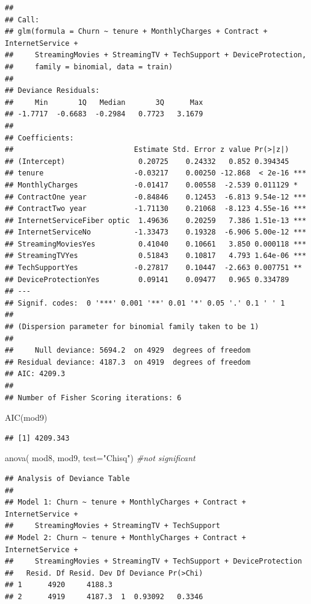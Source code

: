 \documentclass[
  twoside]{article}
\newenvironment{Shaded}{\begin{snugshade}}{\end{snugshade}}
\newcommand{\AttributeTok}[1]{\textcolor[rgb]{0.77,0.63,0.00}{#1}}
\newcommand{\CommentTok}[1]{\textcolor[rgb]{0.56,0.35,0.01}{\textit{#1}}}
\newcommand{\FunctionTok}[1]{\textcolor[rgb]{0.00,0.00,0.00}{#1}}
\newcommand{\NormalTok}[1]{#1}
\newcommand{\StringTok}[1]{\textcolor[rgb]{0.31,0.60,0.02}{#1}}
\begin{document}
\begin{verbatim}
## 
## Call:
## glm(formula = Churn ~ tenure + MonthlyCharges + Contract + InternetService + 
##     StreamingMovies + StreamingTV + TechSupport + DeviceProtection, 
##     family = binomial, data = train)
## 
## Deviance Residuals: 
##     Min       1Q   Median       3Q      Max  
## -1.7717  -0.6683  -0.2984   0.7723   3.1679  
## 
## Coefficients:
##                            Estimate Std. Error z value Pr(>|z|)    
## (Intercept)                 0.20725    0.24332   0.852 0.394345    
## tenure                     -0.03217    0.00250 -12.868  < 2e-16 ***
## MonthlyCharges             -0.01417    0.00558  -2.539 0.011129 *  
## ContractOne year           -0.84846    0.12453  -6.813 9.54e-12 ***
## ContractTwo year           -1.71130    0.21068  -8.123 4.55e-16 ***
## InternetServiceFiber optic  1.49636    0.20259   7.386 1.51e-13 ***
## InternetServiceNo          -1.33473    0.19328  -6.906 5.00e-12 ***
## StreamingMoviesYes          0.41040    0.10661   3.850 0.000118 ***
## StreamingTVYes              0.51843    0.10817   4.793 1.64e-06 ***
## TechSupportYes             -0.27817    0.10447  -2.663 0.007751 ** 
## DeviceProtectionYes         0.09141    0.09477   0.965 0.334789    
## ---
## Signif. codes:  0 '***' 0.001 '**' 0.01 '*' 0.05 '.' 0.1 ' ' 1
## 
## (Dispersion parameter for binomial family taken to be 1)
## 
##     Null deviance: 5694.2  on 4929  degrees of freedom
## Residual deviance: 4187.3  on 4919  degrees of freedom
## AIC: 4209.3
## 
## Number of Fisher Scoring iterations: 6
\end{verbatim}

\begin{Shaded}
\begin{Highlighting}[]
\FunctionTok{AIC}\NormalTok{(mod9)}
\end{Highlighting}
\end{Shaded}

\begin{verbatim}
## [1] 4209.343
\end{verbatim}

\begin{Shaded}
\begin{Highlighting}[]
\FunctionTok{anova}\NormalTok{( mod8, mod9,  }\AttributeTok{test=}\StringTok{"Chisq"}\NormalTok{) }\CommentTok{\#not significant}
\end{Highlighting}
\end{Shaded}

\begin{verbatim}
## Analysis of Deviance Table
## 
## Model 1: Churn ~ tenure + MonthlyCharges + Contract + InternetService + 
##     StreamingMovies + StreamingTV + TechSupport
## Model 2: Churn ~ tenure + MonthlyCharges + Contract + InternetService + 
##     StreamingMovies + StreamingTV + TechSupport + DeviceProtection
##   Resid. Df Resid. Dev Df Deviance Pr(>Chi)
## 1      4920     4188.3                     
## 2      4919     4187.3  1  0.93092   0.3346
\end{verbatim}
\end{document}
